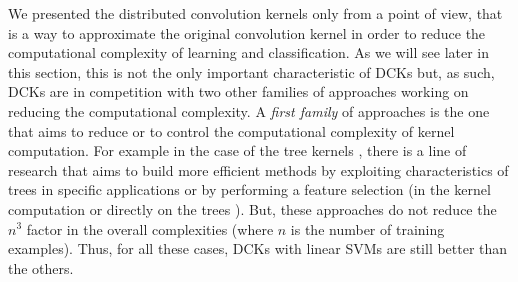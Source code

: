 \documentclass[twoside,11pt]{article}
\def\comment#1#2{}
\begin{document}
We presented the distributed convolution kernels only from a point of view, that is a way to approximate the original convolution kernel in order to reduce the computational complexity of learning and classification. As we will see later in this section, this is not the only important characteristic of DCKs but, as such, DCKs are in competition with two other families of approaches working on reducing the computational complexity. A \emph{first family} of approaches is the one that aims to reduce or to control the computational complexity of kernel computation. For example in the case of the tree kernels \cite{Collins2002}, there is a line of research that aims to build more efficient methods by exploiting characteristics of trees in specific applications \cite{Moschitti2006} or by performing a feature selection (in the kernel computation \cite{Rieck:2010:ATK:1756006.1756022} or directly on the trees \cite{Pighin:Moschitti:conll:2010}). But, these approaches do not reduce the $n^3$ factor in the overall 
complexities (where $n$ is the number of training examples). Thus, for all these cases, DCKs with linear SVMs are still better than the others. 
\comment{[R3,C10][IssueC][IssueE]}{Section 4 is the most important in the paper, since it introduces the actual approach taken by the authors, which is not, as was suggested in Section 3 or 2, to embed subtree structures in $R^d$, but is instead to define a mapping directly from trees to $R^d$ using a rule defined in Definition 3. Although I believe some of these ideas are useful, they read at this point like a series of hacks, most of which were described in Plate ('94) [is there a more definitive reference for this approach than a Ph.D thesis?]. What is probably the most frustrating from a Machine Learning perspective is that none of these approximations learn from data: they are all defined ad-hoc using elementary intuitions and checking that these intuitions have numerical consequences (Figure 3,4,5). While a large challenge of kernel methods in recent years has been to learn compact representations using data (Nystrom, incomplete cholesky etc...) none of this is ever mentioned here.}
\end{document}

